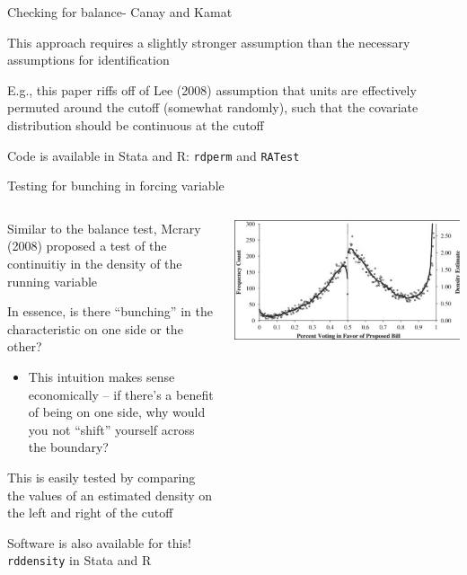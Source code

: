 \documentclass[notes,11pt, aspectratio=169]{beamer}
\newenvironment{wideitemize}{\itemize\addtolength{\itemsep}{10pt}}{\enditemize}
\begin{document}
\begin{frame}{Checking for balance- Canay and Kamat}
  \begin{wideitemize}
  \item This approach requires a slightly stronger assumption than the
    necessary assumptions for identification
  \item E.g., this paper riffs off of Lee (2008) assumption that units
    are effectively permuted around the cutoff (somewhat randomly),
    such that the covariate distribution should be continuous at the
    cutoff
  \item Code is available in Stata and R: \texttt{rdperm} and
    \texttt{RATest}
  \end{wideitemize}
\end{frame}




\begin{frame}{Testing for bunching in forcing variable}
    \begin{columns}[onlytextwidth, T] %
      \begin{column}{.5\textwidth}
        \begin{wideitemize}
        \item Similar to the balance test, Mcrary (2008) proposed a
          test of the continuitiy in the density of the running
          variable
        \item In essence, is there ``bunching'' in the characteristic
          on one side or the other?
          \begin{itemize}
          \item This intuition makes sense economically -- if there's
            a benefit of being on one side, why would you not
            ``shift'' yourself across the boundary?
          \end{itemize}
        \item This is easily tested by comparing the values of an
          estimated density on the left and right of the cutoff
        \item Software is also available for this! \texttt{rddensity}
          in Stata and R
        \end{wideitemize}
      \end{column}%
      \hfill%
      \begin{column}{.5\textwidth}
      \includegraphics[width=\linewidth]{images/mcrary_1.png}
      \end{column}%
    \end{columns}
\end{frame}
\end{document}

